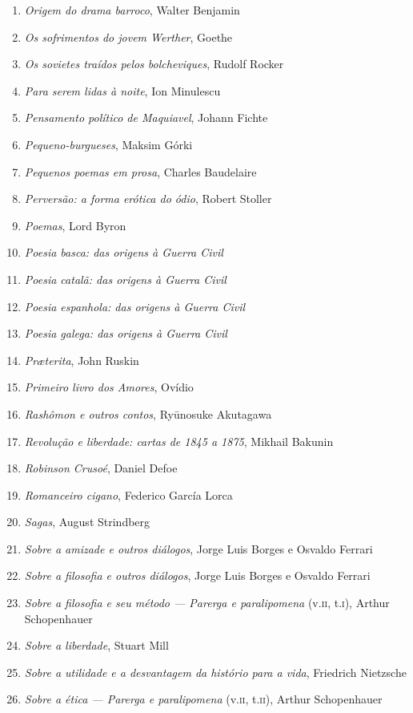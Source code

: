 \begin{enumerate}
\item \textit{Origem do drama barroco}, Walter Benjamin
\item \textit{Os sofrimentos do jovem Werther}, Goethe
\item \textit{Os sovietes traídos pelos bolcheviques}, Rudolf Rocker
\item \textit{Para serem lidas à noite}, Ion Minulescu
\item \textit{Pensamento político de Maquiavel}, Johann Fichte
\item \textit{Pequeno-burgueses}, Maksim Górki
\item \textit{Pequenos poemas em prosa}, Charles Baudelaire
\item \textit{Perversão: a forma erótica do ódio}, Robert Stoller
\item \textit{Poemas}, Lord Byron
\item \textit{Poesia basca: das origens à Guerra Civil} 
\item \textit{Poesia catalã: das origens à Guerra Civil} 
\item \textit{Poesia espanhola: das origens à Guerra Civil} 
\item \textit{Poesia galega: das origens à Guerra Civil} 
\item \textit{Pr\ae terita}, John Ruskin
\item \textit{Primeiro livro dos Amores}, Ovídio
\item \textit{Rashômon e outros contos}, Ryūnosuke Akutagawa
\item \textit{Revolução e liberdade: cartas de 1845 a 1875}, Mikhail Bakunin
\item \textit{Robinson Crusoé}, Daniel Defoe
\item \textit{Romanceiro cigano}, Federico García Lorca
\item \textit{Sagas}, August Strindberg
\item \textit{Sobre a amizade e outros diálogos}, Jorge Luis Borges e Osvaldo Ferrari
\item \textit{Sobre a filosofia e outros diálogos}, Jorge Luis Borges e Osvaldo Ferrari
\item \textit{Sobre a filosofia e seu método --- Parerga e paralipomena} (v.\textsc{ii}, t.\textsc{i}), Arthur Schopenhauer 
\item \textit{Sobre a liberdade}, Stuart Mill
\item \textit{Sobre a utilidade e a desvantagem da histório para a vida}, Friedrich Nietzsche
\item \textit{Sobre a ética --- Parerga e paralipomena} (v.\textsc{ii}, t.\textsc{ii}), Arthur Schopenhauer 

\end{enumerate}
